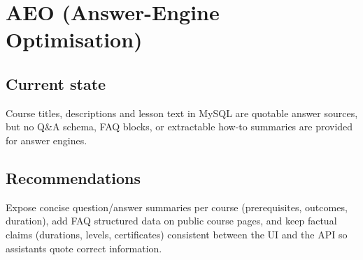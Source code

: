 \section{AEO (Answer-Engine Optimisation)}
\label{sec:aeo}

\subsection{Current state}

Course titles, descriptions and lesson text in MySQL are quotable answer sources, but no Q\&A schema, FAQ blocks, or extractable how-to summaries are provided for answer engines.

\subsection{Recommendations}

Expose concise question/answer summaries per course (prerequisites, outcomes, duration), add FAQ structured data on public course pages, and keep factual claims (durations, levels, certificates) consistent between the UI and the API so assistants quote correct information.
